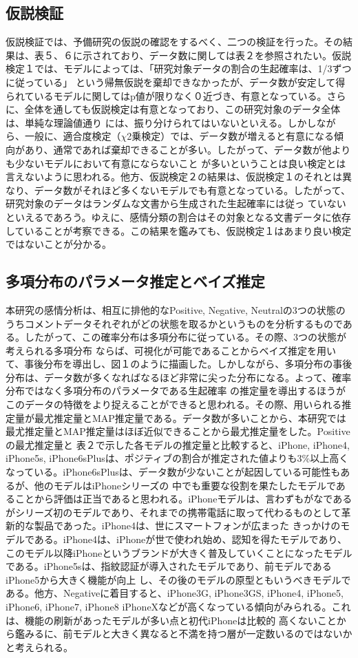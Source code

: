 \documentclass[uplatex,11pt]{jsarticle}
\begin{document}
\subsection{仮説検証}
仮説検証では、予備研究の仮説の確認をするべく、二つの検証を行った。その結果は、表５、６に示されており、データ数に関しては表２を参照されたい。仮説検定１では、モデルによっては、「研究対象データの割合の生起確率は、1/3ずつに従っている」
という帰無仮説を棄却できなかったが、データ数が安定して得られているモデルに関してはp値が限りなく０近づき、有意となっている。さらに、全体を通しても仮説検定は有意となっており、この研究対象のデータ全体は、単純な理論値通り
には、振り分けられてはいないといえる。しかしながら、一般に、適合度検定（$\chi$2乗検定）では、データ数が増えると有意になる傾向があり、通常であれば棄却できることが多い。したがって、データ数が他よりも少ないモデルにおいて有意にならないこと
が多いということは良い検定とは言えないように思われる。他方、仮説検定２の結果は、仮説検定１のそれとは異なり、データ数がそれほど多くないモデルでも有意となっている。したがって、研究対象のデータはランダムな文書から生成された生起確率には従っ
ていないといえるであろう。ゆえに、感情分類の割合はその対象となる文書データに依存していることが考察できる。この結果を鑑みても、仮説検定１はあまり良い検定ではないことが分かる。
\subsection{多項分布のパラメータ推定とベイズ推定}
本研究の感情分析は、相互に排他的なPositive, Negative, Neutralの3つの状態のうちコメントデータそれぞれがどの状態を取るかというものを分析するものである。したがって、この確率分布は多項分布に従っている。その際、3つの状態が考えられる多項分布
ならば、可視化が可能であることからベイズ推定を用いて、事後分布を導出し、図１のように描画した。しかしながら、多項分布の事後分布は、データ数が多くなればなるほど非常に尖った分布になる。よって、確率分布ではなく多項分布のパラメータである生起確率
の推定量を導出するほうがこのデータの特徴をより捉えることができると思われる。その際、用いられる推定量が最尤推定量とMAP推定量である。データ数が多いことから、本研究では最尤推定量とMAP推定量はほぼ近似できることから最尤推定量をした。Positiveの最尤推定量と
表２で示した各モデルの推定量と比較すると、iPhone, iPhone4, iPhone5s, iPhone6sPlusは、ポジティブの割合が推定された値よりも3\%以上高くなっている。iPhone6sPlusは、データ数が少ないことが起因している可能性もあるが、他のモデルはiPhoneシリーズの
中でも重要な役割を果たしたモデルであることから評価は正当であると思われる。iPhoneモデルは、言わずもがなであるがシリーズ初のモデルであり、それまでの携帯電話に取って代わるものとして革新的な製品であった。iPhone4は、世にスマートフォンが広まった
きっかけのモデルである。iPhone4は、iPhoneが世で使われ始め、認知を得たモデルであり、このモデル以降iPhoneというブランドが大きく普及していくことになったモデルである。iPhone5sは、指紋認証が導入されたモデルであり、前モデルであるiPhone5から大きく機能が向上
し、その後のモデルの原型ともいうべきモデルである。他方、Negativeに着目すると、iPhone3G, iPhone3GS, iPhone4, iPhone5, iPhone6, iPhone7, iPhone8 iPhoneXなどが高くなっている傾向がみられる。これは、機能の刷新があったモデルが多い点と初代iPhoneは比較的
高くないことから鑑みるに、前モデルと大きく異なると不満を持つ層が一定数いるのではないかと考えられる。
\end{document}
